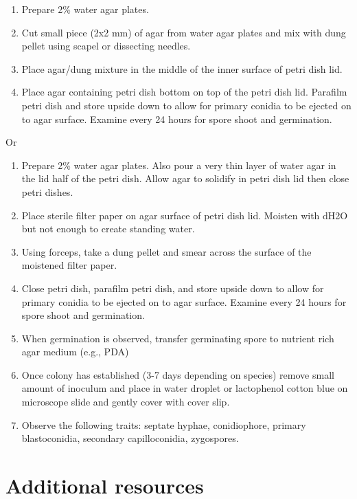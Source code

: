 \documentclass[]{book}
\providecommand{\tightlist}{%
  \setlength{\itemsep}{0pt}\setlength{\parskip}{0pt}}
\begin{document}
\begin{enumerate}
\def\labelenumi{\arabic{enumi}.}
\tightlist
\item
  Prepare 2\% water agar plates.
\item
  Cut small piece (2x2 mm) of agar from water agar plates and mix with dung pellet using scapel or dissecting needles.
\item
  Place agar/dung mixture in the middle of the inner surface of petri dish lid.
\item
  Place agar containing petri dish bottom on top of the petri dish lid. Parafilm petri dish and store upside down to allow for primary conidia to be ejected on to agar surface. Examine every 24 hours for spore shoot and germination.
\end{enumerate}

Or

\begin{enumerate}
\def\labelenumi{\arabic{enumi}.}
\tightlist
\item
  Prepare 2\% water agar plates. Also pour a very thin layer of water agar in the lid half of the petri dish. Allow agar to solidify in petri dish lid then close petri dishes.
\item
  Place sterile filter paper on agar surface of petri dish lid. Moisten with dH2O but not enough to create standing water.
\item
  Using forceps, take a dung pellet and smear across the surface of the moistened filter paper.
\item
  Close petri dish, parafilm petri dish, and store upside down to allow for primary conidia to be ejected on to agar surface. Examine every 24 hours for spore shoot and germination.
\item
  When germination is observed, transfer germinating spore to nutrient rich agar medium (e.g., PDA)
\item
  Once colony has established (3-7 days depending on species) remove small amount of inoculum and place in water droplet or lactophenol cotton blue on microscope slide and gently cover with cover slip.
\item
  Observe the following traits: septate hyphae, conidiophore, primary blastoconidia, secondary capilloconidia, zygospores.
\end{enumerate}

\hypertarget{additional-resources-1}{%
\section{Additional resources}\label{additional-resources-1}}
\end{document}
